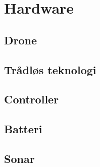 \documentclass[Main]{subfiles}
\begin{document}
\chapter{Hardware}
\section{Drone}
\section{Trådløs teknologi}
\section{Controller}
\section{Batteri}
\section{Sonar}
\end{document}
